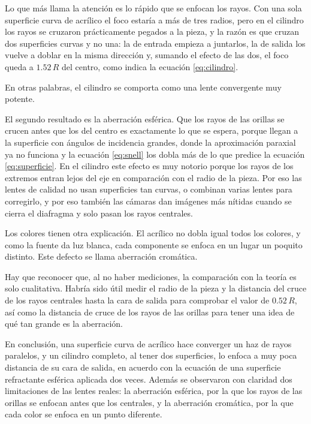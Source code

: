 Lo que más llama la atención es lo rápido que se enfocan los rayos. Con una sola superficie curva de acrílico el foco estaría a más de tres radios, pero en el cilindro los rayos se cruzaron prácticamente pegados a la pieza, y la razón es que cruzan dos superficies curvas y no una: la de entrada empieza a juntarlos, la de salida los vuelve a doblar en la misma dirección y, sumando el efecto de las dos, el foco queda a $1.52\,R$ del centro, como indica la ecuación \eqref{eq:cilindro}.

En otras palabras, el cilindro se comporta como una lente convergente muy potente.

El segundo resultado es la aberración esférica. Que los rayos de las orillas se crucen antes que los del centro es exactamente lo que se espera, porque llegan a la superficie con ángulos de incidencia grandes, donde la aproximación paraxial ya no funciona y la ecuación \eqref{eq:snell} los dobla más de lo que predice la ecuación \eqref{eq:superficie}. En el cilindro este efecto es muy notorio porque los rayos de los extremos entran lejos del eje en comparación con el radio de la pieza. Por eso las lentes de calidad no usan superficies tan curvas, o combinan varias lentes para corregirlo, y por eso también las cámaras dan imágenes más nítidas cuando se cierra el diafragma y solo pasan los rayos centrales.

Los colores tienen otra explicación. El acrílico no dobla igual todos los colores, y como la fuente da luz blanca, cada componente se enfoca en un lugar un poquito distinto. Este defecto se llama aberración cromática.

Hay que reconocer que, al no haber mediciones, la comparación con la teoría es solo cualitativa. Habría sido útil medir el radio de la pieza y la distancia del cruce de los rayos centrales hasta la cara de salida para comprobar el valor de $0.52\,R$, así como la distancia de cruce de los rayos de las orillas para tener una idea de qué tan grande es la aberración.

En conclusión, una superficie curva de acrílico hace converger un haz de rayos paralelos, y un cilindro completo, al tener dos superficies, lo enfoca a muy poca distancia de su cara de salida, en acuerdo con la ecuación de una superficie refractante esférica aplicada dos veces. Además se observaron con claridad dos limitaciones de las lentes reales: la aberración esférica, por la que los rayos de las orillas se enfocan antes que los centrales, y la aberración cromática, por la que cada color se enfoca en un punto diferente.
